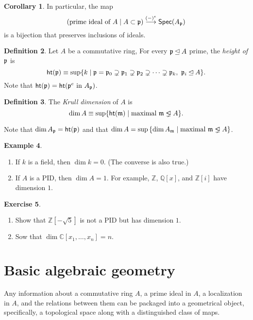 \documentclass[10pt,letterpaper,cm]{nupset}
\theoremstyle{definition}
\newtheorem{definition}{Definition}[subsection]
\newtheorem{exmp}[definition]{Example}
\theoremstyle{theorem}
\newtheorem{corollary}[definition]{Corollary}
\newtheorem{exercise}[definition]{Exercise}
\theoremstyle{remark}
\newcommand{\C}{\mathbb C}
\newcommand{\Q}{\mathbb Q}
\newcommand{\Z}{\mathbb Z}
\newcommand{\1}{\mathbf{1}}
\newcommand{\p}{\frak{p}}
\newcommand{\0}{\vec 0}
\newcommand{\properideal}{%
  \mathrel{\ooalign{$\lneq$\cr\raise.22ex\hbox{$\lhd$}\cr}}}
\begin{document}
\begin{corollary}
In particular, the map $$\left(\text{prime ideal of } A \mid A \subset \p\right) \overset{(-)^e}{\longrightarrow} \mathsf{Spec}(A_{\p})$$ is a bijection that preserves inclusions of ideals. 
\end{corollary}

\begin{definition}
Let $A$ be a commutative ring, For every $\p \unlhd A$ prime, the \textit{height of $\p$} is $$\mathsf{ht}(\p) \equiv \sup\{ k \mid \p = \p_0 \supsetneq \p_1 \supsetneq \p_2 \supsetneq \cdots \supsetneq \p_k, \  \p_i \unlhd A   \}. $$ Note that $\mathsf{ht}(\p) = \mathsf{ht}(\p^e \text{ in } A_{\p})$.
\end{definition}

\begin{definition}
The \textit{Krull dimension} of $A$ is $$ \dim{A} \equiv \sup \{  \mathsf{ht}(\frak{m}) \mid \text{maximal } \frak{m} \properideal A \}  .$$
\end{definition}


Note that $\dim{A_{\p}} = \mathsf{ht}(\p)$ and that $\dim{A} = \sup\left\{ \dim{A_{\frak{m}}} \mid \text{maximal } \frak{m} \properideal A\right\}$.


\begin{exmp} $ $
\begin{enumerate}
\item If $k$ is a field, then $\dim{k} =0$. (The converse is also true.)
\item If $A$ is a PID, then $\dim{A} =1$. For example, $\Z$, $\Q[x]$, and $\Z[i]$ have dimension $1$.
\end{enumerate}
\end{exmp}

\begin{exercise} $ $
\begin{enumerate}
\item Show that $\Z\left[{-\sqrt{5}}\right]$ is not a PID but has dimension $1$. 
\item Sow that $\dim{\C[x_1, \ldots, x_n]} =n$. 
\end{enumerate}
\end{exercise}

\section{Basic algebraic geometry}


Any information about a commutative ring $A$, a prime ideal in $A$, a localization in $A$, and the relations between them can be packaged into a geometrical object, specifically, a topological space along with a distinguished class of maps. 
\end{document}
